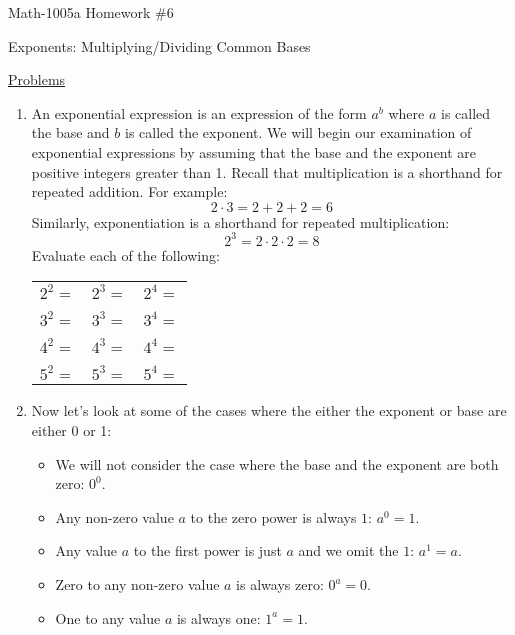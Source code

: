 \documentclass[letterpaper,12pt,fleqn]{article}
\begin{document}
\begin{center}
  \Large Math-1005a Homework \#6
  
  Exponents: Multiplying/Dividing Common Bases
\end{center}

\vspace{0.5in}

\underline{Problems}

\begin{enumerate}
\item An exponential expression is an expression of the form $a^b$ where $a$
  is called the base and $b$ is called the exponent. We will begin our
  examination of exponential expressions by assuming that the base and the
  exponent are positive integers greater than 1. Recall that multiplication is
  a shorthand for repeated addition. For example:
  \[2\cdot3=2+2+2=6\]
  Similarly, exponentiation is a shorthand for repeated multiplication:
  \[2^3=2\cdot2\cdot2=8\]
  Evaluate each of the following:
  
  \begin{tabular}{p{1.5in}p{1.5in}p{1.5in}}
    $2^2=$ & $2^3=$ & $2^4=$ \\
    \\
    $3^2=$ & $3^3=$ & $3^4=$ \\
    \\
    $4^2=$ & $4^3=$ & $4^4=$ \\
    \\
    $5^2=$ & $5^3=$ & $5^4=$
  \end{tabular}

\item Now let's look at some of the cases where the either the exponent or base
  are either 0 or 1:
  \begin{itemize}
  \item We will not consider the case where the base and the exponent are
    both zero: $0^0$.

  \item Any non-zero value $a$ to the zero power is always $1$: $a^0=1$.

  \item Any value $a$ to the first power is just $a$ and we omit the $1$:
    $a^1=a$.

  \item Zero to any non-zero value $a$ is always zero: $0^a=0$.

  \item One to any value $a$ is always one: $1^a=1$.
  \end{itemize}


\end{enumerate}
\end{document}
